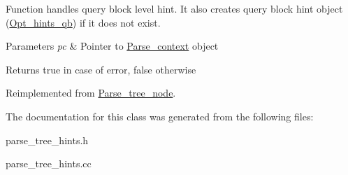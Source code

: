 Function handles query block level hint. It also creates query block hint object (\mbox{\hyperlink{classOpt__hints__qb}{Opt\+\_\+hints\+\_\+qb}}) if it does not exist.


\begin{DoxyParams}{Parameters}
{\em pc} & Pointer to \mbox{\hyperlink{structParse__context}{Parse\+\_\+context}} object\\
\hline
\end{DoxyParams}
\begin{DoxyReturn}{Returns}
true in case of error, false otherwise 
\end{DoxyReturn}


Reimplemented from \mbox{\hyperlink{classParse__tree__node_a22d93524a537d0df652d7efa144f23da}{Parse\+\_\+tree\+\_\+node}}.



The documentation for this class was generated from the following files\+:\begin{DoxyCompactItemize}
\item 
parse\+\_\+tree\+\_\+hints.\+h\item 
parse\+\_\+tree\+\_\+hints.\+cc\end{DoxyCompactItemize}

